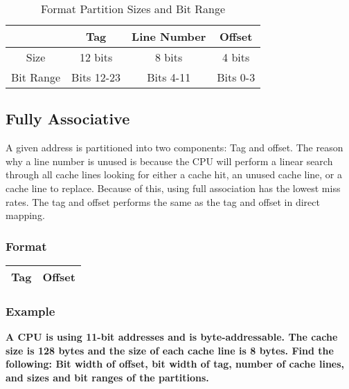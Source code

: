 \documentclass[11pt]{article}
\begin{document}
\begin{table}[H]
	\centering
	\caption*{Format Partition Sizes and Bit Range}
	\begin{tabular}{| c | c | c | c |}
		\hline
					&	Tag		&	Line Number		&	Offset\\
		\hline
		Size		&	12 bits	&	8 bits			&	4 bits\\
		\hline
		Bit Range	&	Bits 12-23	&	Bits 4-11	&	Bits 0-3\\
		\hline
	\end{tabular}
\end{table}

\subsection{Fully Associative}

A given address is partitioned into two components: Tag and offset. The reason why a line number is unused is because the CPU will perform a linear search through all cache lines looking for either a cache hit, an unused cache line, or a cache line to replace. Because of this, using full association has the lowest miss rates. The tag and offset performs the same as the tag and offset in direct mapping.


\subsubsection{Format}

\begin{table}[H]
	\centering
	\begin{tabular}{| c | c |}
		\hline
		Tag			&		 Offset\\
		\hline
	\end{tabular}
\end{table}

\subsubsection{Example}

\textbf{A CPU is using 11-bit addresses and is byte-addressable. The cache size is 128 bytes and the size of each cache line is 8 bytes. Find the following: Bit width of offset, bit width of tag, number of cache lines, and sizes and bit ranges of the partitions.}
\end{document}
